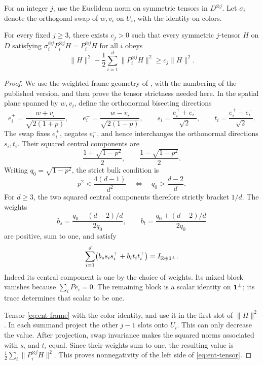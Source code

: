 For an integer \(j\), use the Euclidean norm on symmetric tensors
in \(D^{\otimes j}\). Let \(\sigma_i\) denote the orthogonal swap of
\(w,v_i\) on \(U_i\), with the identity on colors.

\begin{lemma}\label{ent:tensor}
For every fixed \(j\ge3\), there exists \(c_j>0\) such that every
symmetric \(j\)-tensor \(H\) on \(D\) satisfying
\(\sigma_i^{\otimes j}P_i^{\otimes j}H=P_i^{\otimes j}H\) for all
\(i\) obeys
\begin{equation}\label{eq:ent-tensor}
 \|H\|^2-\frac12\sum_{i=1}^d\|P_i^{\otimes j}H\|^2
 \ge c_j\|H\|^2 .
\end{equation}
\end{lemma}

\begin{proof}
We use the weighted-frame geometry of
\citet[Lemma~11.3]{BackhauszSzegedy}, with the numbering of the
published version, and then prove the tensor strictness needed here.
In the spatial plane spanned by \(w,v_i\), define the orthonormal
bisecting directions
\[
 e_i^+=\frac{w+v_i}{\sqrt{2(1+p)}},\qquad
 e_i^-=\frac{w-v_i}{\sqrt{2(1-p)}},\qquad
 s_i=\frac{e_i^++e_i^-}{\sqrt2},\qquad
 t_i=\frac{e_i^+-e_i^-}{\sqrt2}.
\]
The swap fixes \(e_i^+\), negates \(e_i^-\), and hence interchanges
the orthonormal directions \(s_i,t_i\). Their squared central
components are
\[
 \frac{1+\sqrt{1-p^2}}2,\qquad
 \frac{1-\sqrt{1-p^2}}2.
\]
Writing \(q_0=\sqrt{1-p^2}\), the strict bulk condition is
\[
 p^2<\frac{4(d-1)}{d^2}
 \quad\Longleftrightarrow\quad q_0>\frac{d-2}{d}.
\]
For \(d\ge3\), the two squared central components therefore
strictly bracket \(1/d\). The weights
\[
 b_s=\frac{q_0-(d-2)/d}{2q_0},\qquad
 b_t=\frac{q_0+(d-2)/d}{2q_0}
\]
are positive, sum to one, and satisfy
\begin{equation}\label{eq:ent-frame}
 \sum_{i=1}^d\bigl(b_s s_is_i^\top+b_t t_it_i^\top\bigr)
 =I_{\mathbb R\oplus{\bf1}^{\perp}}.
\end{equation}
Indeed its central component is one by the choice of weights.
Its mixed block vanishes because \(\sum_iPe_i=0\).
The remaining block is a scalar identity on \({\bf1}^{\perp}\);
its trace determines that scalar to be one.

Tensor \eqref{eq:ent-frame} with the color identity, and use it
in the first slot of \(\|H\|^2\). In each summand project the other
\(j-1\) slots onto \(U_i\). This can only decrease the value.
After projection, swap invariance makes the squared norms associated
with \(s_i\) and \(t_i\) equal. Since their weights sum to one,
the resulting value is
\(\frac12\sum_i\|P_i^{\otimes j}H\|^2\).
This proves nonnegativity of the left side of
\eqref{eq:ent-tensor}.


\end{proof}
